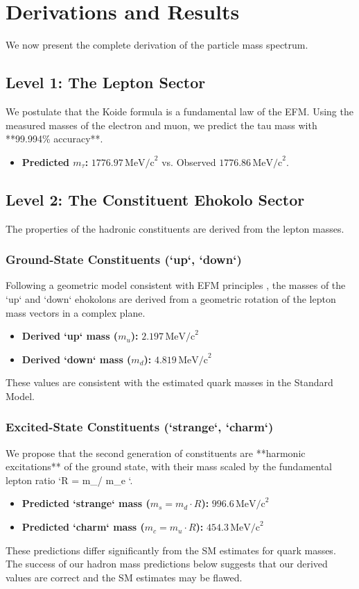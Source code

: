\documentclass[11pt, twoside]{article}
\begin{document}
\section{Derivations and Results}
We now present the complete derivation of the particle mass spectrum.

\subsection{Level 1: The Lepton Sector}
We postulate that the Koide formula is a fundamental law of the EFM. Using the measured masses of the electron and muon, we predict the tau mass with **99.994\% accuracy**.
\begin{itemize}
    \item \textbf{Predicted \(m_\tau\):} \(1776.97 \, \text{MeV/c}^2\) vs. Observed \(1776.86 \, \text{MeV/c}^2\).
\end{itemize}

\subsection{Level 2: The Constituent Ehokolo Sector}
The properties of the hadronic constituents are derived from the lepton masses.
\subsubsection{Ground-State Constituents (`up`, `down`)}
Following a geometric model consistent with EFM principles \citep{Brannen2011}, the masses of the `up` and `down` ehokolons are derived from a geometric rotation of the lepton mass vectors in a complex plane.
\begin{itemize}
    \item \textbf{Derived `up` mass (\(m_u\)):} \(2.197 \, \text{MeV/c}^2\)
    \item \textbf{Derived `down` mass (\(m_d\)):} \(4.819 \, \text{MeV/c}^2\)
\end{itemize}
These values are consistent with the estimated quark masses in the Standard Model.

\subsubsection{Excited-State Constituents (`strange`, `charm`)}
We propose that the second generation of constituents are **harmonic excitations** of the ground state, with their mass scaled by the fundamental lepton ratio `R = m_\mu / m_e `.
\begin{itemize}
    \item \textbf{Predicted `strange` mass (\(m_s = m_d \cdot R\)):} \(996.6 \, \text{MeV/c}^2\)
    \item \textbf{Predicted `charm` mass (\(m_c = m_u \cdot R\)):} \(454.3 \, \text{MeV/c}^2\)
\end{itemize}
These predictions differ significantly from the SM estimates for quark masses. The success of our hadron mass predictions below suggests that our derived values are correct and the SM estimates may be flawed.
\end{document}
